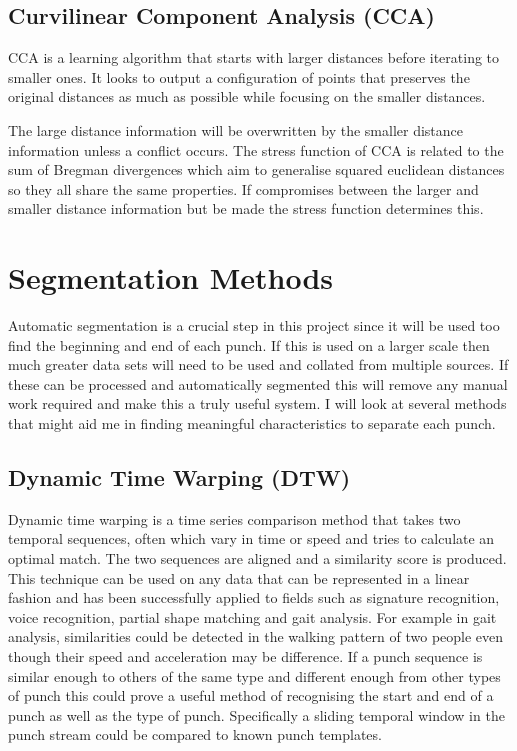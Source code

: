 \subsection{Curvilinear Component Analysis (CCA)}
CCA is a learning algorithm that starts with larger distances before iterating to smaller ones.\cite{Demartines1997} It looks to output a configuration of points that preserves the original distances as much as possible while focusing on the smaller distances.

The large distance information will be overwritten by the smaller distance information unless a conflict occurs. The stress function of CCA is related to the sum of Bregman divergences which aim to generalise squared euclidean distances so they all share the same properties. If compromises between the larger and smaller distance information but be made the stress function determines this.

\section{Segmentation Methods}
Automatic segmentation is a crucial step in this project since it will be used too find the beginning and end of each punch. If this is used on a larger scale then much greater data sets will need to be used and collated from multiple sources. If these can be processed and automatically segmented this will remove any manual work required and make this a truly useful system. I will look at several methods that might aid me in finding meaningful characteristics to separate each punch.

\subsection{Dynamic Time Warping (DTW)}
Dynamic time warping is a time series comparison method that takes two temporal sequences, often which vary in time or speed and tries to calculate an optimal match. The two sequences are aligned and a similarity score is produced. This technique can be used on any data that can be represented in a linear fashion and has been successfully applied to fields such as signature recognition, voice recognition, partial shape matching and gait analysis. For example in gait analysis, similarities could be detected in the walking pattern of two people even though their speed and acceleration may be difference.
If a punch sequence is similar enough to others of the same type and different enough from other types of punch this could prove a useful method of recognising the start and end of a punch as well as the type of punch. Specifically a sliding temporal window in the punch stream could be compared to known punch templates.


